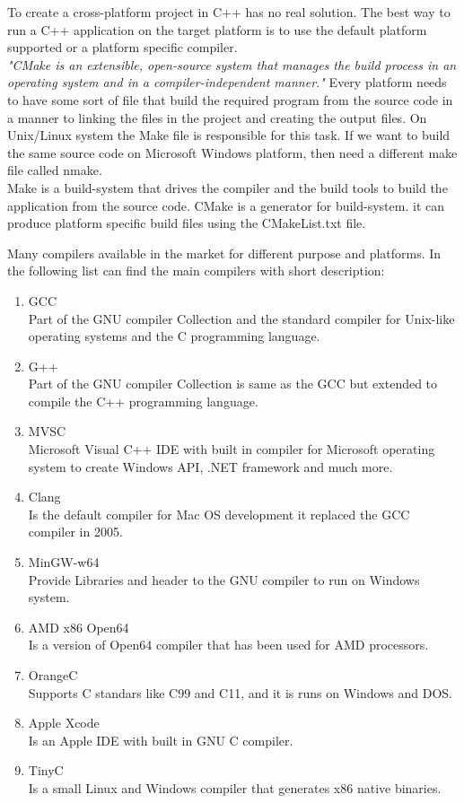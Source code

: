 \documentclass[12pt]{article}
\begin{document}
To create a cross-platform project in C++ has no real solution. The best way to run a C++ application on the target platform is to use the default platform supported or a platform specific compiler.\\

\textit{"CMake is an extensible, open-source system that manages the build process in an operating system and in a compiler-independent manner."\cite{CMake}} Every platform needs to have some sort of file that build the required program from the source code in a manner to linking the files in the project and creating the output files. On Unix/Linux system the Make file is responsible for this task. If we want to build the same source code on Microsoft Windows platform, then need a different make file called nmake.\\

 Make is a build-system that drives the compiler and the build tools to build the application from the source code. CMake is a generator for build-system. it can produce platform specific build files using the CMakeList.txt file.\\

{\setlength{\parindent}{0cm}
Many compilers available in the market for different purpose and platforms. In the following list can find the main compilers with short description:\cite{Heng} 
\begin{enumerate}
\item GCC\\
Part of the GNU compiler Collection and the standard compiler for Unix-like operating systems and the C programming language. 
\item G++\\
Part of the GNU compiler Collection is same as the GCC but extended to compile the C++ programming language.
\item MVSC\\
Microsoft Visual C++ IDE with built in compiler for Microsoft operating system to create Windows API, .NET framework and much more.
\item Clang\\
Is the default compiler for Mac OS development it replaced the GCC compiler in 2005.
\item MinGW-w64\\
Provide Libraries and header to the GNU compiler to run on Windows system.
\item AMD x86 Open64\\
Is a version of Open64 compiler that has been used for AMD processors.
\item OrangeC\\
Supports C standars like C99 and C11, and it is runs on Windows and DOS.
\item Apple Xcode\\
Is an Apple IDE with built in GNU C compiler.
\item TinyC\\
Is a small Linux and Windows compiler that generates x86 native binaries.
\end{enumerate}
}
\end{document}
